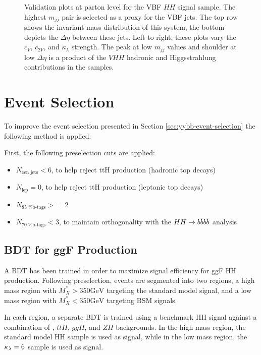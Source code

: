 \begin{figure}[htbp]
    \caption{Validation plots at parton level for the VBF $HH$ signal sample. The highest $m_{jj}$ pair is selected as a proxy for the VBF jets. The top row shows the invariant mass distribution of this system, the bottom depicts the $\Delta \eta$ between these jets. Left to right, these plots vary the $c_V$, $c_{2V}$, and $\kappa_\lambda$ strength. The peak at low $m_{jj}$ values and shoulder at low $\Delta \eta$ is a product of the $VHH$ hadronic and Higgsstrahlung contributions in the samples.}
    \label{fig:vbf-mc-validation}
\end{figure}

\section{Event Selection} \label{ssec:vbf-event-selection}

To improve the event selection presented in Section \ref{sec:yybb-event-selection} the following method is applied:

First, the following preselection cuts are applied:

\begin{itemize}
	\item $N_{\text{cen jets}} < 6$, to help reject ttH production (hadronic top decays)
	\item $N_{\text{lep}} = 0$, to help reject ttH production (leptonic top decays)
	\item $N_{\text{85 \% b-tags}} >= 2$ 
	\item $N_{\text{70 \% b-tags}} < 3$, to maintain orthogonality with the $HH \rightarrow b\bar{b}b\bar{b}$ analysis
\end{itemize}

\subsection{BDT for ggF Production}
A \gls{BDT} has been trained in order to maximize signal efficiency for ggF HH production. Following preselection, events are segmented into two regions, a high mass region with $M_X^{*} > 350 \text{GeV}$ targeting the standard model signal, and a low mass region with $M_X^{*} < 350 \text{GeV}$ targeting BSM signals. 

In each region, a separate BDT is trained using a benchmark HH signal against a combination of \yy, $ttH$, $ggH$, and $ZH$ backgrounds. In the high mass region, the standard model HH sample is used as signal, while in the low mass region, the $\kappa_{\lambda} = 6$ sample is used as signal.

